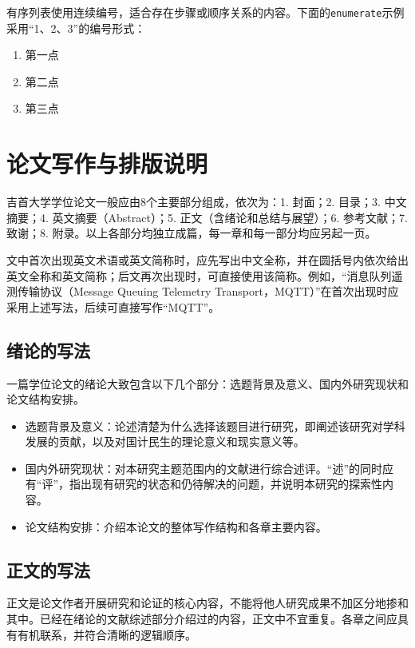 \documentclass[12pt, a4paper, fontset=fandol]{ctexart}
\numberwithin{equation}{section}
\begin{document}
有序列表使用连续编号，适合存在步骤或顺序关系的内容。下面的\texttt{enumerate}示例采用“1、2、3”的编号形式：

\begin{enumerate}[label=\arabic*、,leftmargin=4em]
  \item 第一点
  \item 第二点
  \item 第三点
\end{enumerate}


\section{论文写作与排版说明}

吉首大学学位论文一般应由8个主要部分组成，依次为：1. 封面；2. 目录；3. 中文摘要；4. 英文摘要（Abstract）；5. 正文（含绪论和总结与展望）；6. 参考文献；7. 致谢；8. 附录。以上各部分均独立成篇，每一章和每一部分均应另起一页。

文中首次出现英文术语或英文简称时，应先写出中文全称，并在圆括号内依次给出英文全称和英文简称；后文再次出现时，可直接使用该简称。例如，“消息队列遥测传输协议（Message Queuing Telemetry Transport，MQTT）”在首次出现时应采用上述写法，后续可直接写作“MQTT”。

\subsection{绪论的写法}

一篇学位论文的绪论大致包含以下几个部分：选题背景及意义、国内外研究现状和论文结构安排。

\begin{itemize}
  \item 选题背景及意义：论述清楚为什么选择该题目进行研究，即阐述该研究对学科发展的贡献，以及对国计民生的理论意义和现实意义等。
  \item 国内外研究现状：对本研究主题范围内的文献进行综合述评。“述”的同时应有“评”，指出现有研究的状态和仍待解决的问题，并说明本研究的探索性内容。
  \item 论文结构安排：介绍本论文的整体写作结构和各章主要内容。
\end{itemize}

\subsection{正文的写法}

正文是论文作者开展研究和论证的核心内容，不能将他人研究成果不加区分地掺和其中。已经在绪论的文献综述部分介绍过的内容，正文中不宜重复。各章之间应具有有机联系，并符合清晰的逻辑顺序。
\end{document}
